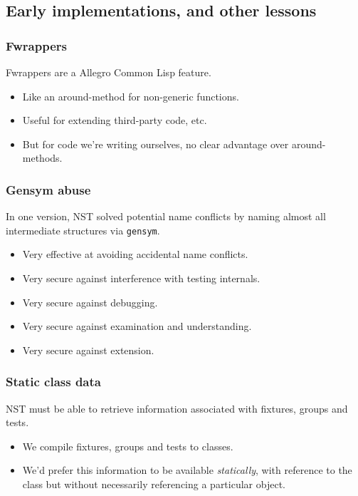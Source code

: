 \documentclass{beamer}
\begin{document}
\subsection{Early implementations, and other lessons}

\begin{frame}
  \frametitle{Fwrappers}
  
  Fwrappers are a Allegro Common Lisp feature.
  \begin{itemize}
  \item Like an around-method for non-generic functions.
  \item Useful for extending third-party code, etc.
  \item But for code we're writing ourselves, no clear advantage over
    around-methods.
  \end{itemize}
\end{frame}

\begin{frame}
  \frametitle{Gensym abuse}

  In one version, NST solved potential name conflicts by naming almost
  all intermediate structures via \texttt{gensym}.
  \begin{itemize}
  \item<2-> Very effective at avoiding accidental name conflicts.
  \item<2-> Very secure against interference with testing internals.
  \item<3-> Very secure against debugging.
  \item<3-> Very secure against examination and understanding.
  \item<3-> Very secure against extension.
  \end{itemize}
\end{frame}

\begin{frame}[fragile]
  \frametitle{Static class data}

  NST must be able to retrieve information associated with fixtures,
  groups and tests.
  \begin{itemize}
  \item We compile fixtures, groups and tests to classes.
  \item We'd prefer this information to be available
    \emph{statically}, with reference to the class but without
    necessarily referencing a particular object.
  \end{itemize}
\end{frame}
\end{document}
